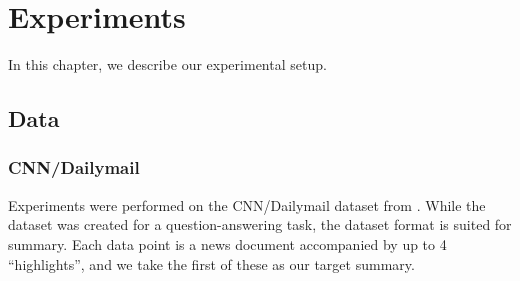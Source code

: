 \documentclass[12pt]{report}
\begin{document}



%
%

%


\chapter{Experiments}
\label{chap:experiments}

In this chapter, we describe our experimental setup.

\section{Data}

\subsection{CNN/Dailymail}

Experiments were performed on the CNN/Dailymail dataset from \cite{Hermann2015}.
While the dataset was created for a question-answering task, the dataset format is suited for summary. Each data point is a news document accompanied by up to 4 ``highlights'', and we take the first of these as our target summary.
\end{document}
